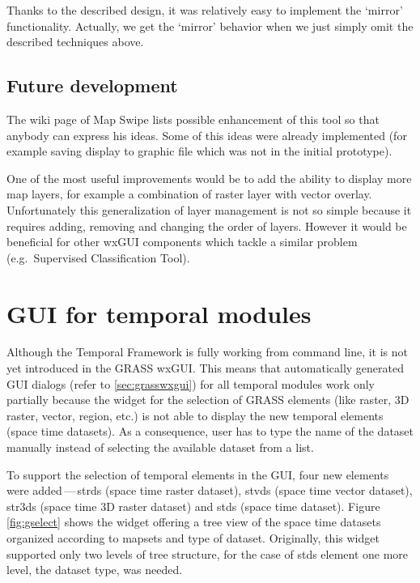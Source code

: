 \documentclass[a4paper,12pt,oneside]{book}
\newcommand{\tf}{Temporal Framework\xspace}
\newcommand{\ms}{Map Swipe\xspace}
\newcommand{\dash}{\mbox{\,---\,}}
\begin{document}
Thanks to the described design, it was relatively easy to implement the `mirror' functionality.
Actually, we get the `mirror' behavior when we just simply omit the described techniques above.

\subsection{Future development}
The wiki page \cite{mapswipeWiki} of \ms lists possible enhancement of this tool
so that anybody can express his ideas. Some of this ideas were already implemented
(for example saving display to graphic file which was not in the initial prototype).

One of the most useful improvements would be to add the ability to display
more map layers, for example a combination of raster layer with vector overlay.
Unfortunately this generalization of layer management is not so simple
because it requires adding, removing and changing the order of layers.
However it would be beneficial for other wxGUI components which tackle a similar problem
(e.g.\ Supervised Classification Tool).

\section{GUI for temporal modules}
Although the \tf is fully working from command line, it is not yet introduced in the GRASS wxGUI.
This means that automatically generated GUI dialogs (refer to \ref{sec:grasswxgui})
for all temporal modules work only partially because the widget for the selection of GRASS elements
(like raster, 3D raster, vector, region, etc.) is not able to display the new temporal elements
(space time datasets). As a consequence, user has to type the name of the dataset manually
instead of selecting the available dataset from a list.

To support the selection of temporal elements in the GUI, four new elements were
added\dash strds (space time raster dataset), stvds (space time vector dataset),
str3ds (space time 3D raster dataset) and stds (space time dataset).
Figure \ref{fig:gselect} shows the widget offering a tree view of the space time datasets
organized according to mapsets and type of dataset.
Originally, this widget supported only two levels of tree structure,
for the case of stds element one more level, the dataset type, was needed.
\end{document}
